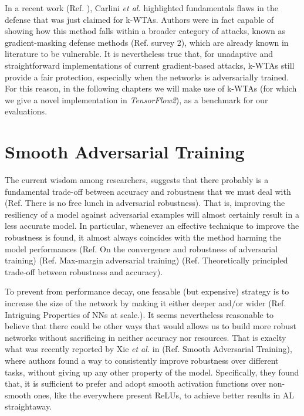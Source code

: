 \documentclass[LaM,binding=0.6cm]{./packages/sapthesis/sapthesis}
\begin{document}
    In a recent work (Ref. ), Carlini \textit{et al.} highlighted fundamentals flaws in the defense that was just claimed for k-WTAs.
    Authors were in fact capable of showing how this method falls within a broader category of attacks, known as gradient-masking
    defense methods (Ref. survey 2), which are already known in literature to be vulnerable.
    It is nevertheless true that, for unadaptive and straightforward implementations of current gradient-based attacks, k-WTAs
    still provide a fair protection, especially when the networks is adversarially trained. For this reason, in the following chapters
    we will make use of k-WTAs (for which we give a novel implementation in \textit{TensorFlow2}), as a benchmark for our evaluations.

    \section{Smooth Adversarial Training}

    The current wisdom among researchers, suggests that there probably is a fundamental trade-off between accuracy and robustness that we must deal with
    (Ref. There is no free lunch in adversarial robustness). That is, improving the resiliency of a model against adversarial examples will almost certainly 
    result in a less accurate model. In particular, whenever an effective technique to improve the robustness is found, it almost always coincides with the method harming
    the model performances (Ref. On the convergence and robustness of adversarial training) (Ref. Max-margin adversarial training) (Ref. 
    Theoretically principled trade-off between robustness and accuracy).
    
    To prevent from performance decay, one feasable (but expensive) strategy is to increase the size of the network by making it either deeper and/or wider (Ref. Intriguing Properties of NNs at scale.).
    It seems nevertheless reasonable to believe that there could be other ways that would allows us to build more robust networks without 
    sacrificing in neither accuracy nor resources. That is exaclty what was recently reported by Xie \textit{et al.} in (Ref. Smooth Adversarial Training), where authors 
    found a way to consistently improve robustness over different tasks, without giving up any other property of the model. Specifically, they found that,
    it is sufficient to prefer and adopt smooth activation functions over non-smooth ones, like the everywhere present ReLUs, to achieve 
    better results in AL straightaway.
\end{document}
